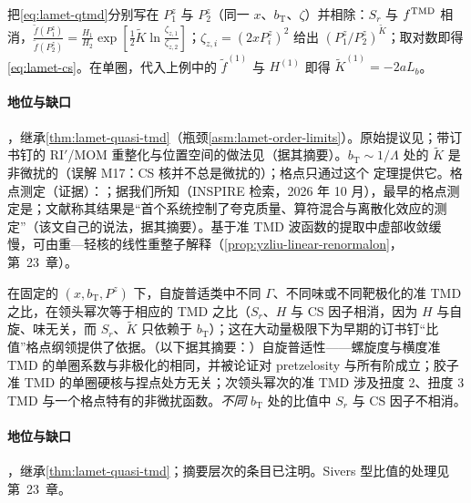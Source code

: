 \begin{proofsketch}
把\cref{eq:lamet-qtmd}分别写在 $P_1^z$ 与 $P_2^z$（同一 $x$、$b_{\mathrm T}$、$\zeta$）并相除：$S_r$ 与 $f^{\rm TMD}$ 相消，$\frac{\tilde f(P_1^z)}{\tilde f(P_2^z)}=\frac{H_1}{H_2}\exp[\frac12\tilde K\ln\frac{\zeta_{z,1}}{\zeta_{z,2}}]$；$\zeta_{z,i}=(2xP^z_i)^2$ 给出 $(P_1^z/P_2^z)^{\tilde K}$；取对数即得\cref{eq:lamet-cs}。在单圈，代入上例中的 $\tilde f^{(1)}$ 与 $H^{(1)}$ 即得 $\tilde K^{(1)}=-2aL_b$。
\end{proofsketch}

\paragraph{地位与缺口}
\tagA，继承\cref{thm:lamet-quasi-tmd}（瓶颈\cref{asm:lamet-order-limits}）。原始提议见\cite{EbertStewartZhao2019}；带订书钉的 RI$'$/MOM 重整化与位置空间的做法见\cite{Ebert:2019tvc}（据其摘要）。$b_{\mathrm T}\sim1/\Lambda$ 处的 $\tilde K$ 是非微扰的（误解 M17：CS 核并不总是微扰的）；格点只通过这个 \tagA 定理提供它。格点测定（证据）：\cite{Shanahan:2020zxr,Shanahan:2021tst,Schlemmer:2021aij,LatticePartonLPC:2022eev,LatticePartonLPC:2023pdv,Avkhadiev:2023poz,Avkhadiev:2024mgd,Bollweg:2024zet,Tan:2025ofx}；据我们所知（INSPIRE 检索，2026 年 10 月），最早的格点测定是\cite{Shanahan:2020zxr}；文献\cite{Avkhadiev:2024mgd}称其结果是“首个系统控制了夸克质量、算符混合与离散化效应的测定”（该文自己的说法，据其摘要）。基于准 TMD 波函数的提取中虚部收敛缓慢，可由重—轻核的线性重整子解释（\cref{prop:yzliu-linear-renormalon}，第~23~章）。

\begin{proposition}\label{prop:lamet-tmd-ratios}
在固定的 $(x,b_{\mathrm T},P^z)$ 下，自旋普适类中不同 $\Gamma$、不同味或不同靶极化的准 TMD 之比，在领头幂次等于相应的 TMD 之比（$S_r$、$H$ 与 CS 因子相消，因为 $H$ 与自旋、味无关，而 $S_r$、$\tilde K$ 只依赖于 $b_{\mathrm T}$）；这在大动量极限下为早期的订书钉“比值”格点纲领\cite{Hagler:2009mb,Musch:2010ka,Musch:2011er,Yoon:2017qzo}提供了依据\cite{Ebert:2022fmh,Vladimirov:2020ofp}。（以下据其摘要：）自旋普适性——螺旋度与横度准 TMD 的单圈系数与非极化的相同，并被论证对 pretzelosity 与所有阶成立\cite{Ebert:2020gxr}；胶子准 TMD 的单圈硬核与捏点处方无关\cite{Zhu:2022bja}；次领头幂次的准 TMD 涉及扭度 2、扭度 3 TMD 与一个格点特有的非微扰函数\cite{Rodini:2022wic}。\emph{不同} $b_{\mathrm T}$ 处的比值中 $S_r$ 与 CS 因子不相消。
\end{proposition}

\paragraph{地位与缺口}
\tagA，继承\cref{thm:lamet-quasi-tmd}；摘要层次的条目已注明。Sivers 型比值的处理见第~23~章。

